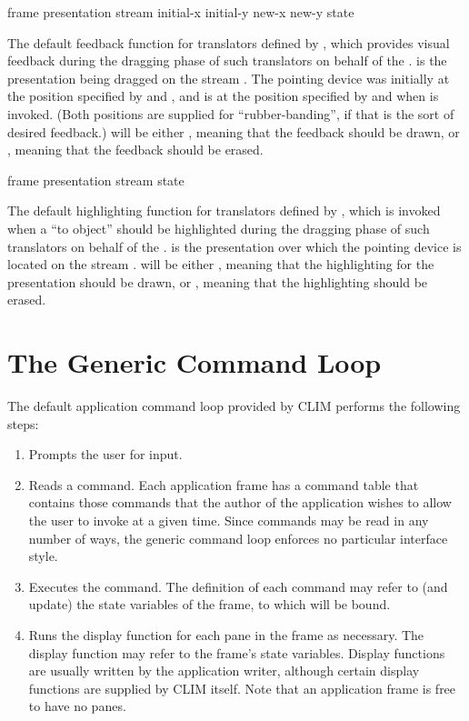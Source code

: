  {frame presentation stream
                                            initial-x initial-y new-x new-y state} 

The default feedback function for translators defined by
, which provides visual feedback during the
dragging phase of such translators on behalf of the  .
 is the presentation being dragged on the stream .
The pointing device was initially at the position specified by 
and , and is at the position specified by  and
 when  is invoked.  (Both positions
are supplied for ``rubber-banding'', if that is the sort of desired feedback.)
 will be either , meaning that the feedback should be
drawn, or , meaning that the feedback should be erased.

 {frame presentation stream state}

The default highlighting function for translators defined by
, which is invoked when a ``to object''
should be highlighted during the dragging phase of such translators on behalf of
the  .   is the presentation over which
the pointing device is located on the stream .   will be
either , meaning that the highlighting for the presentation
should be drawn, or , meaning that the highlighting should be
erased.


\section {The Generic Command Loop}

The default application command loop provided by CLIM performs the following
steps:

\begin{enumerate}
\item Prompts the user for input.

\item Reads a command.  Each application frame has a command table that contains
those commands that the author of the application wishes to allow the user to
invoke at a given time.  Since commands may be read in any number of ways, the
generic command loop enforces no particular interface style.

\item Executes the command.  The definition of each command may refer to (and
update) the state variables of the frame, to which  will
be bound.

\item Runs the display function for each pane in the frame as necessary.  The
display function may refer to the frame's state variables.  Display functions
are usually written by the application writer, although certain display
functions are supplied by CLIM itself.  Note that an application frame is free
to have no panes.
\end{enumerate}


